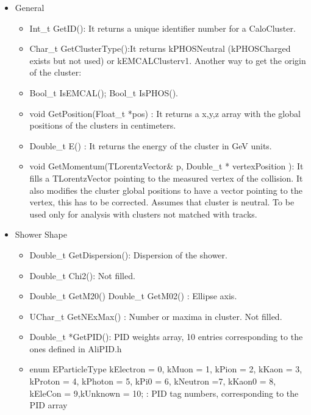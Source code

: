 \begin{itemize}
\item General
	\begin{itemize}
	\item Int\_t GetID(): It returns a unique identifier number for a CaloCluster.

	\item Char\_t GetClusterType():It returns kPHOSNeutral (kPHOSCharged exists but not used) or  kEMCALClusterv1. Another way to get the origin of the cluster:

	\item Bool\_t IsEMCAL(); Bool\_t IsPHOS(). 

	\item void GetPosition(Float\_t *pos) : It returns a {x,y,z} array with the global positions of the clusters in centimeters.

	\item Double\_t E() : It returns the energy of the cluster in GeV units.

	\item void GetMomentum(TLorentzVector\& p, Double\_t * vertexPosition ): It fills a TLorentzVector pointing to the measured vertex of the collision. It also modifies the cluster global positions to have a vector pointing to the vertex, this has to be corrected. Assumes that cluster is neutral. To be used only for analysis with clusters not matched with tracks.
	\end{itemize}
\item Shower Shape
	\begin{itemize}

	\item Double\_t GetDispersion(): Dispersion of the shower.

	\item Double\_t Chi2(): Not filled.

	\item Double\_t GetM20()  Double\_t GetM02() : Ellipse axis.

	\item UChar\_t GetNExMax() : Number or maxima in cluster. Not filled.

	\item Double\_t *GetPID(): PID weights array, 10 entries corresponding to the ones defined in AliPID.h

	 \item enum EParticleType { kElectron = 0,  kMuon = 1, kPion = 2, kKaon = 3, kProton = 4, kPhoton = 5, kPi0 = 6, kNeutron =7, kKaon0 = 8, kEleCon = 9,kUnknown = 10}; : PID tag numbers, corresponding to the PID array


\end{itemize}
\end{itemize}
